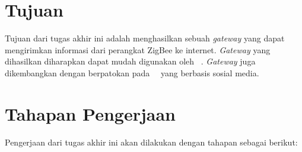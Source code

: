 \section{Tujuan}
Tujuan dari tugas akhir ini adalah menghasilkan sebuah \textit{gateway} yang dapat mengirimkan informasi dari perangkat ZigBee ke internet. \textit{Gateway} yang dihasilkan diharapkan dapat mudah digunakan oleh \eu~. \textit{Gateway} juga dikembangkan dengan berpatokan pada \plat~\iot~yang berbasis sosial media. 

\section{Tahapan Pengerjaan}
Pengerjaan dari tugas akhir ini akan dilakukan dengan tahapan sebagai berikut:
